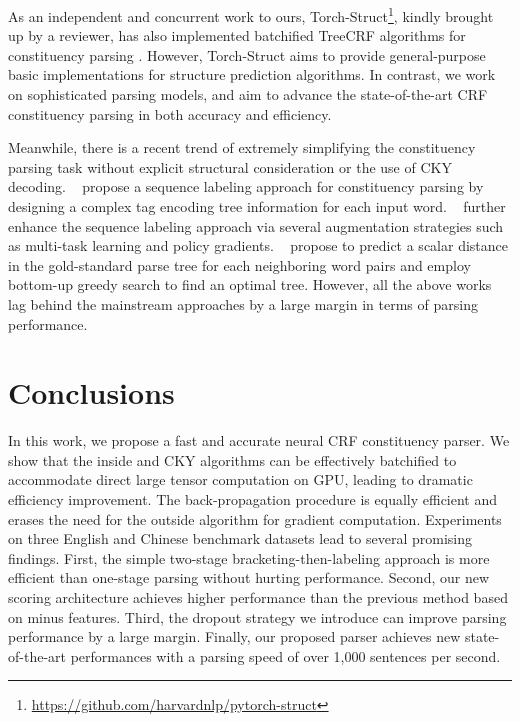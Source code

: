 \documentclass{article}
\begin{document}
As an independent and concurrent work to ours, Torch-Struct\footnote{\url{https://github.com/harvardnlp/pytorch-struct}}, kindly brought up by a reviewer, has also implemented batchified TreeCRF algorithms for constituency parsing \cite{alex-2020-torchstruct}.
However, Torch-Struct aims to provide general-purpose basic implementations for structure prediction algorithms.
In contrast, we work on sophisticated parsing models, and aim to advance the state-of-the-art CRF constituency parsing in both accuracy and efficiency.


















Meanwhile, there is a recent trend of extremely simplifying the constituency parsing task without explicit structural consideration or the use of CKY decoding.
\citeauthor{gomez-rodriguez-vilares-2018-constituent}~ propose a sequence labeling approach for constituency parsing by designing a complex tag encoding tree information for each input word.
\citeauthor{vilares-etal-2019-better}~ further enhance the sequence labeling approach via several augmentation strategies such as multi-task learning and policy gradients.
\citeauthor{shen-etal-2018-straight}~ propose to predict a scalar distance in the gold-standard parse tree for each neighboring word pairs and employ bottom-up greedy search to find an optimal tree.
However, all the above works lag behind the mainstream approaches by a large margin in terms of parsing performance.










 \section{Conclusions}
\label{section:conclusions}

In this work, we propose a fast and accurate neural CRF constituency parser. We show that the inside and CKY algorithms can be effectively batchified to accommodate direct large tensor computation on GPU, leading to dramatic efficiency improvement.
The back-propagation procedure is equally efficient and erases the need for the outside algorithm for gradient computation.
Experiments on three English and Chinese benchmark datasets lead to several promising findings.
First, the simple two-stage bracketing-then-labeling approach is more efficient than one-stage parsing without hurting performance.
Second, our new scoring architecture achieves higher performance than the previous method based on minus features.
Third, the dropout strategy we introduce can improve parsing performance by a large margin.
Finally, our proposed parser achieves new state-of-the-art performances with a parsing speed of over 1,000 sentences per second.
\end{document}
